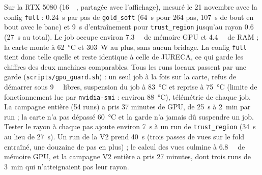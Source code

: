 \documentclass[11pt,a4paper]{article}
\newcommand{\code}[1]{\texttt{#1}}
\newcommand{\chemin}[1]{\nolinkurl{#1}}%
\begin{document}
Sur la RTX 5080 (\SI{16}{\giga\byte}, partagée avec l'affichage), mesuré le 21 novembre avec la
config \code{full} : \SI{0.24}{\second} par pas de \code{gold\_soft} (\SI{64}{\second} pour 264
pas, \SI{107}{\second} de bout en bout avec le banc) et \SI{9}{\second} d'entraînement pour
\code{trust\_region} jusqu'au rayon \num{0.6} (\SI{27}{\second} au total). Le job occupe environ
\SI{7.3}{\giga\byte} de mémoire GPU et \SI{4.4}{\giga\byte} de RAM ; la carte monte à
\SI{62}{\celsius} et \SI{303}{\watt} au plus, sans aucun bridage. La config \code{full} tient donc
telle quelle et reste identique à celle de JURECA, ce qui garde les chiffres des deux machines
comparables. Tous les runs locaux passent par une garde (\chemin{scripts/gpu_guard.sh}) : un seul
job à la fois sur la carte, refus de démarrer sous \SI{9}{\giga\byte} libres, suspension du job à
\SI{83}{\celsius} et reprise à \SI{75}{\celsius} (limite de fonctionnement lue par
\code{nvidia-smi} : environ \SI{88}{\celsius}), télémétrie de chaque job. La campagne entière
(54 runs) a pris 37 minutes de GPU, de \SI{25}{\second} à \SI{2}{\minute} par run ; la carte n'a
pas dépassé \SI{60}{\celsius} et la garde n'a jamais dû suspendre un job. Tester le rayon à chaque
pas ajoute environ \SI{7}{\second} à un run de \code{trust\_region} (\SI{34}{\second} au lieu de
\SI{27}{\second}). Un run de la V2 prend \SI{40}{\second} (trois passes de vues sur le fold
entraîné, une douzaine de pas en plus) ; le calcul des vues culmine à \SI{6.8}{\giga\byte} de
mémoire GPU, et la campagne V2 entière a pris 27 minutes, dont trois runs de \SI{3}{\minute} qui
n'atteignaient pas leur rayon.
\end{document}
